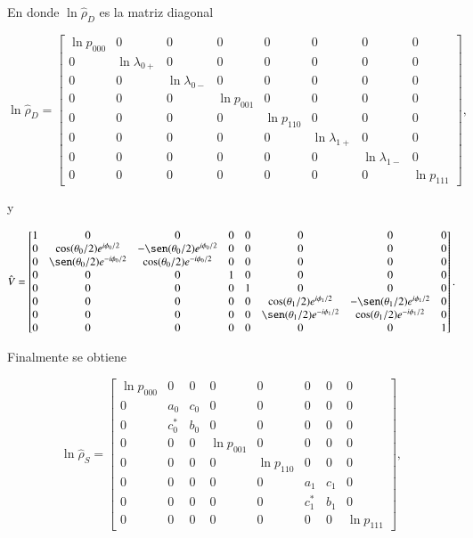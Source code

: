 \begin{appendixs}
En donde $\ln \hat{\rho}_{D}$ es la matriz diagonal 

\begin{equation*}
    \ln \hat{\rho}_{D} = 
    \begin{bmatrix}
        \ln p_{000} & 0 & 0 & 0 & 0 & 0 & 0 & 0 \\
        0 & \ln \lambda_{0+} & 0 & 0 & 0 & 0 & 0 & 0 \\
        0 & 0 & \ln \lambda_{0-} & 0 & 0 & 0 & 0 & 0 \\
        0 & 0 & 0 & \ln p_{001} & 0 & 0 & 0 & 0 \\
        0 & 0 & 0 & 0 & \ln p_{110} & 0 & 0 & 0 \\
        0 & 0 & 0 & 0 & 0 & \ln \lambda_{1+} & 0 & 0 \\
        0 & 0 & 0 & 0 & 0 & 0 & \ln \lambda_{1-} & 0 \\
        0 & 0 & 0 & 0 & 0 & 0 & 0 & \ln p_{111} 
        \end{bmatrix},
\end{equation*}

y 

\begin{equation*}
    \hat{V} = 
    \begin{bmatrix}
        1 & 0 & 0 & 0 & 0 & 0 & 0 & 0 \\
        0 & \cos(\theta_{0}/2)e^{i\phi_{0}/2} & -\sen(\theta_{0}/2)e^{i\phi_{0}/2} & 0 & 0 & 0 & 0 & 0 \\
        0 & \sen(\theta_{0}/2)e^{-i\phi_{0}/2} & \cos(\theta_{0}/2)e^{-i\phi_{0}/2} & 0 & 0 & 0 & 0 & 0 \\
        0 & 0 & 0 & 1 & 0 & 0 & 0 & 0 \\
        0 & 0 & 0 & 0 & 1 & 0 & 0 & 0 \\
        0 & 0 & 0 & 0 & 0 &  \cos(\theta_{1}/2)e^{i\phi_{1}/2} & -\sen(\theta_{1}/2)e^{i\phi_{1}/2} & 0 \\
        0 & 0 & 0 & 0 & 0 & \sen(\theta_{1}/2)e^{-i\phi_{1}/2} & \cos(\theta_{1}/2)e^{-i\phi_{1}/2} & 0 \\
        0 & 0 & 0 & 0 & 0 & 0 & 0 & 1 
        \end{bmatrix}.
\end{equation*}

Finalmente se obtiene

\begin{equation*}
    \ln \hat{\rho}_{S} = 
    \begin{bmatrix}
        \ln p_{000} & 0 & 0 & 0 & 0 & 0 & 0 & 0 \\
        0 & a_{0} & c_{0} & 0 & 0 & 0 & 0 & 0 \\
        0 & c^{*}_{0} & b_{0} & 0 & 0 & 0 & 0 & 0 \\
        0 & 0 & 0 & \ln p_{001} & 0 & 0 & 0 & 0 \\
        0 & 0 & 0 & 0 & \ln p_{110} & 0 & 0 & 0 \\
        0 & 0 & 0 & 0 & 0 & a_{1} & c_{1} & 0 \\
        0 & 0 & 0 & 0 & 0 & c^{*}_{1} & b_{1} & 0 \\
        0 & 0 & 0 & 0 & 0 & 0 & 0 & \ln p_{111} 
        \end{bmatrix},
\end{equation*}


\end{appendixs}
